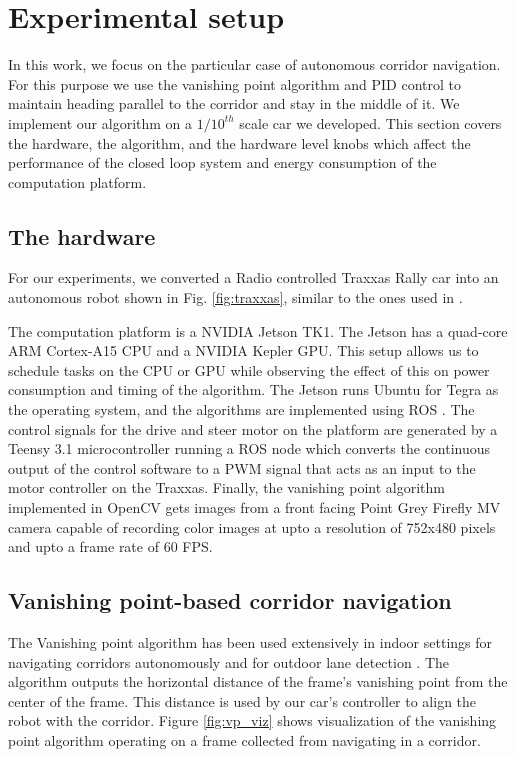 \section{Experimental setup}

In this work, we focus on the particular case of autonomous corridor navigation. 
For this purpose we use the vanishing point algorithm and PID control to maintain heading parallel to the corridor and stay in the middle of it. We implement our algorithm on a $1/10^{th}$ scale car we developed. This section covers the hardware, the algorithm, and the hardware level knobs which affect the performance of the closed loop system and energy consumption of the computation platform.

\subsection{The hardware}

For our experiments, we converted a Radio controlled Traxxas Rally car into an autonomous robot shown in Fig. \ref{fig:traxxas}, similar to the ones used in \cite{racecar_mit}.

The computation platform is a NVIDIA Jetson TK1. 
The Jetson has a quad-core ARM Cortex-A15 CPU and a NVIDIA Kepler GPU. 
This setup allows us to schedule tasks on the CPU or GPU while observing the effect of this on power consumption and timing of the algorithm. 
The Jetson runs Ubuntu for Tegra as the operating system, and the algorithms are implemented using ROS \cite{ros}. The control signals for the drive and steer motor on the platform are generated by a Teensy 3.1 microcontroller running a ROS node which converts the continuous output of the control software to a PWM signal that acts as an input to the motor controller on the Traxxas. 
Finally, the vanishing point algorithm implemented in OpenCV \cite{opencv} gets images from a front facing Point Grey Firefly MV camera capable of recording color images at upto a resolution of 752x480 pixels and upto a frame rate of 60 FPS. 

\subsection{Vanishing point-based corridor navigation}

The Vanishing point algorithm \cite{VP1} has been used extensively in indoor settings for navigating corridors autonomously \cite{VP2, VP3} and for outdoor lane detection \cite{gallagher2002ground}. 
The algorithm outputs the horizontal distance of the frame's vanishing point from the center of the frame. 
This distance is used by our car's controller to align the robot with the corridor. Figure \ref{fig:vp_viz} shows visualization of the vanishing point algorithm operating on a frame collected from navigating in a corridor.


